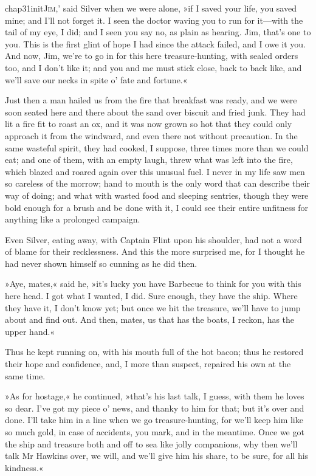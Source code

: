 
   \lettrine[ante=`,lines=4,image=true]{chap31initJ}{im},' said Silver when we were alone, »if I saved your life, you saved mine; and I'll not forget it. I seen the doctor waving you to run for it—with the tail of my eye, I did; and I seen you say no, as plain as hearing. Jim, that's one to you. This is the first glint of hope I had since the attack failed, and I owe it you. And now, Jim, we're to go in for this here treasure-hunting, with sealed orders too, and I don't like it; and you and me must stick close, back to back like, and we'll save our necks in spite o' fate and fortune.«

Just then a man hailed us from the fire that breakfast was ready, and we were soon seated here and there about the sand over biscuit and fried junk. They had lit a fire fit to roast an ox, and it was now grown so hot that they could only approach it from the windward, and even there not without precaution. In the same wasteful spirit, they had cooked, I suppose, three times more than we could eat; and one of them, with an empty laugh, threw what was left into the fire, which blazed and roared again over this unusual fuel. I never in my life saw men so careless of the morrow; hand to mouth is the only word that can describe their way of doing; and what with wasted food and sleeping sentries, though they were bold enough for a brush and be done with it, I could see their entire unfitness for anything like a prolonged campaign.

Even Silver, eating away, with Captain Flint upon his shoulder, had not a word of blame for their recklessness. And this the more surprised me, for I thought he had never shown himself so cunning as he did then.

»Aye, mates,« said he, »it's lucky you have Barbecue to think for you with this here head. I got what I wanted, I did. Sure enough, they have the ship. Where they have it, I don't know yet; but once we hit the treasure, we'll have to jump about and find out. And then, mates, us that has the boats, I reckon, has the upper hand.«

Thus he kept running on, with his mouth full of the hot bacon; thus he restored their hope and confidence, and, I more than suspect, repaired his own at the same time.

»As for hostage,« he continued, »that's his last talk, I guess, with them he loves so dear. I've got my piece o' news, and thanky to him for that; but it's over and done. I'll take him in a line when we go treasure-hunting, for we'll keep him like so much gold, in case of accidents, you mark, and in the meantime. Once we got the ship and treasure both and off to sea like jolly companions, why then we'll talk Mr Hawkins over, we will, and we'll give him his share, to be sure, for all his kindness.«

